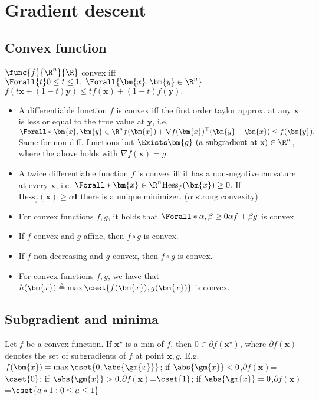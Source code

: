 \section{Gradient descent}
\subsection{Convex function}

$\func{f}{\R^{n}}{\R}$ convex iff $\Forall{t} 0 \leq t \leq 1,\; \Forall{\bm{x}, \bm{y} \in \R^{n}}$
  $f(t\bm{x} + (1-t)\bm{y}) \leq tf(\bm{x}) + (1-t)f(\bm{y}).$

\begin{itemize}
\item
A differentiable function $f$ is convex iff the first order taylor approx. at any $\bm{x}$ is less or equal to the true
value at $\bm{y}$, i.e.
$\Forall*{\bm{x},\bm{y} \in \R^{n}} f(\bm{x}) + \nabla f(\bm{x})^{\top}(\bm{y}-\bm{x}) \leq f(\bm{y}).$
Same for non-diff. functions but $\Exists \bm{g} \text{ (a subgradient at x)} \in \R^{n}$,
where the above holds with $\nabla f(\bm{x}) = g$
\item
A twice differentiable function $f$ is convex iff it has a non-negative curvature at every $\bm{x}$, i.e.
$
  \Forall*{\bm{x} \in \R^{n}} \text{Hess}_{f}(\bm{x}) \geq 0.
$
If $\text{Hess}_{f}(\bm{x}) \geq \alpha \bm{I}$ there is a unique minimizer. ($\alpha$ strong convexity)
\item
For convex functions $f,g$, it holds that $\Forall*{\alpha,\beta \geq 0} \alpha f + \beta g$ is convex.
\item
If $f$ convex and $g$ affine, then $f \circ g$ is convex.
\item
If $f$ non-decreasing and $g$ convex, then $f \circ g$ is convex.
\item
For convex functions $f,g$, we have that
$
  h(\bm{x}) \triangleq \max\cset{f(\bm{x}), g(\bm{x})}
$
is convex.
\end{itemize}
%
\subsection{Subgradient and minima}
Let $f$ be a convex function. If $\bm{x}^{\star}$ is a min of $f$, then $0 \in \partial f(\bm{x}^{\star})$,
where $\partial f(\bm{x})$ denotes the set of subgradients of $f$ at point $\bm{x}, g$.
E.g. $f(\bm{x}) = \max\cset{0, \abs{\gm{x}}}$;
if $\abs{\gm{x}}<0$,$\partial f(\bm{x})$=$\cset{0}$;
if $\abs{\gm{x}}>0$,$\partial f(\bm{x})$=$\cset{1}$;
if $\abs{\gm{x}}=0$,$\partial f(\bm{x})$=$\cset{a*1 : 0 \leq a \leq 1}$

